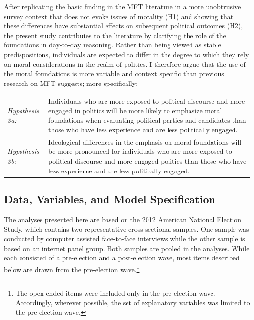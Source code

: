 \documentclass[12pt]{article}
\begin{document}
After replicating the basic finding in the MFT literature in a more unobtrusive survey context that does not evoke issues of morality (H1) and showing that these differences have substantial effects on subsequent political outcomes (H2), the present study contributes to the literature by clarifying the role of the foundations in day-to-day reasoning. Rather than being viewed as stable predispositions, individuals are expected to differ in the degree to which they rely on moral considerations in the realm of politics. I therefore argue that the use of the moral foundations is more variable and context specific than previous research on MFT suggests; more specifically:

\vspace{0.3cm}
\begin{tabular}{lp{12cm}}
\textsl{Hypothesis 3a:} & Individuals who are more exposed to political discourse and more engaged in politics will be more likely to emphasize moral foundations when evaluating political parties and candidates than those who have less experience and are less politically engaged. \\
\textsl{Hypothesis 3b:} & Ideological differences in the emphasis on moral foundations will be more pronounced for individuals who are more exposed to political discourse and more engaged politics than those who have less experience and are less politically engaged.
\end{tabular}
\vspace{0.5cm}







\subsection{Data, Variables, and Model Specification}

The analyses presented here are based on the 2012 American National Election Study, which contains two representative cross-sectional samples. One sample was conducted by computer assisted face-to-face interviews while the other sample is based on an internet panel group. Both samples are pooled in the analyses. While each consisted of a pre-election and a post-election wave, most items described below are drawn from the pre-election wave.\footnote{The open-ended items were included only in the pre-election wave. Accordingly, wherever possible, the set of explanatory variables was limited to the pre-election wave.}
\end{document}

